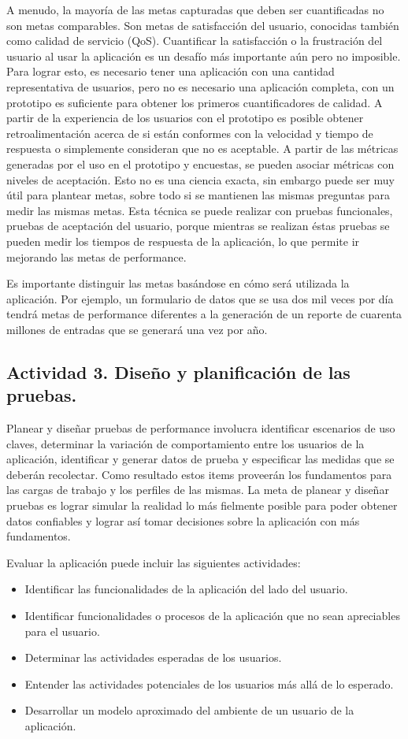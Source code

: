 A menudo, la mayoría de las metas capturadas que deben ser cuantificadas no son metas comparables. Son metas de satisfacción del usuario, conocidas también como calidad de
servicio (QoS). Cuantificar la satisfacción o la frustración del usuario al usar la aplicación es un desafío más importante aún pero no imposible. Para lograr esto, es necesario tener una
aplicación con una cantidad representativa de usuarios, pero no es necesario una aplicación completa, con un prototipo es suficiente para obtener los primeros cuantificadores de calidad.
A partir de la experiencia de los usuarios con el prototipo es posible obtener retroalimentación acerca de si están conformes con la velocidad y tiempo de respuesta o
simplemente consideran que no es aceptable. A partir de las métricas generadas por el uso en el prototipo y encuestas, se pueden asociar métricas con niveles de aceptación. Esto no
es una ciencia exacta, sin embargo puede ser muy útil para plantear metas, sobre todo si se mantienen las mismas preguntas para medir las mismas metas. Esta técnica se
puede realizar con pruebas funcionales, pruebas de aceptación del usuario, porque mientras se realizan éstas pruebas se pueden medir los tiempos de respuesta de la aplicación, lo que permite ir mejorando las metas de performance.

Es importante distinguir las metas basándose en cómo será utilizada la aplicación. Por ejemplo, un formulario de datos que se usa dos mil veces por día tendrá metas de performance
diferentes a la generación de un reporte de cuarenta millones de entradas que se generará una vez por año.
  
\subsection{Actividad 3. Diseño y planificación de las pruebas.}
Planear y diseñar pruebas de performance involucra identificar escenarios de uso claves, determinar la variación de comportamiento entre los usuarios de la aplicación, identificar y
generar datos de prueba y especificar las medidas que se deberán recolectar. Como resultado estos items proveerán los fundamentos para las cargas de trabajo y los perfiles de las
mismas. La meta de planear y diseñar pruebas es lograr simular la realidad lo más fielmente posible para poder obtener datos confiables y lograr así tomar decisiones sobre la aplicación
con más fundamentos.

Evaluar la aplicación puede incluir las siguientes actividades:
\begin{itemize}
	\item
	Identificar las funcionalidades de la aplicación del lado del usuario.
	\item
	Identificar funcionalidades o procesos de la aplicación que no sean apreciables para el usuario.
	\item
	Determinar las actividades esperadas de los usuarios.
	\item
	Entender las actividades potenciales de los usuarios más allá de lo esperado.
	\item
	Desarrollar un modelo aproximado del ambiente de un usuario de la aplicación.
\end{itemize}


